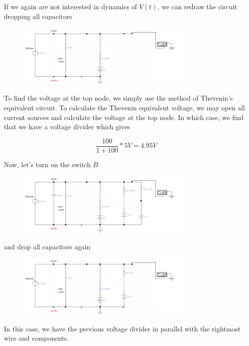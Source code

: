 \documentclass[12]{book}
\newcommand\0{\mathbf{0}}
\newcommand\<{\langle}
\renewcommand\>{\rangle}
\begin{document}
If we again are not interested in dynamics of $V(t)$, we can redraw the circuit dropping all capacitors
 
 \begin{figure}[H]
 \centering
\includegraphics[width=0.8\textwidth]{exercise1-4}
\end{figure}

To find the voltage at the top node, we simply use the method of Thevenin's equivalent circuit\cite{fortney1987principles}. To calculate the Thevenin equivalent voltage, we may open all current sources and calculate the voltage at the top node. In which case, we find that we have a voltage divider which gives 

$$\frac{100}{1+100} * 5V = 4.95 V$$

Now, let's turn on the switch $B$
 
 \begin{figure}[H]
\includegraphics[width=0.8\textwidth]{exercise1-5}
\end{figure}

and drop all capacitors again
 
\begin{figure}[H]
\centering
\includegraphics[width=0.8\textwidth]{exercise1-6}
\end{figure}

In this case, we have the previous voltage divider in parallel with the rightmost wire and components. 
\end{document}
